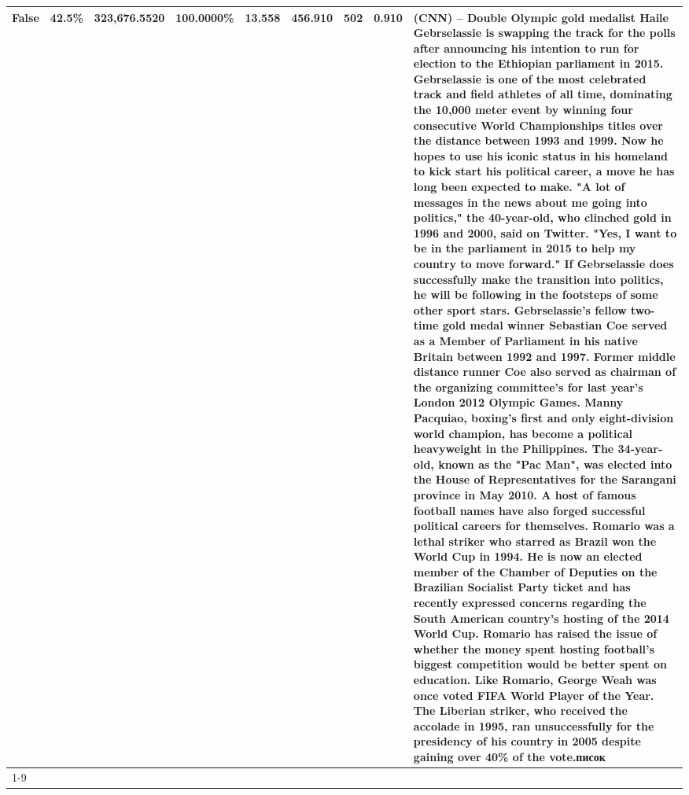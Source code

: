 \begin{table}[H]
{\begin{tabular}{lllrlllll}
False & 42.5\% & 323,676.5520 & \bfseries \color{red} 100.0000\% & 13.558 & 456.910 & 502 & 0.910 & (CNN) -- Double Olympic gold medalist Haile Gebrselassie is swapping the track for the polls after announcing his intention to run for election to the Ethiopian parliament in 2015. Gebrselassie is one of the most celebrated track and field athletes of all time, dominating the 10,000 meter event by winning four consecutive World Championships titles over the distance between 1993 and 1999. Now he hopes to use his iconic status in his homeland to kick start his political career, a move he has long been expected to make. "A lot of messages in the news about me going into politics," the 40-year-old, who clinched gold in 1996 and 2000, said on Twitter. "Yes, I want to be in the parliament in 2015 to help my country to move forward." If Gebrselassie does successfully make the transition into politics, he will be following in the footsteps of some other sport stars. Gebrselassie's fellow two-time gold medal winner Sebastian Coe served as a Member of Parliament in his native Britain between 1992 and 1997. Former middle distance runner Coe also served as chairman of the organizing committee's for last year's London 2012 Olympic Games. Manny Pacquiao, boxing's first and only eight-division world champion, has become a political heavyweight in the Philippines. The 34-year-old, known as the "Pac Man", was elected into the House of Representatives for the Sarangani province in May 2010. A host of famous football names have also forged successful political careers for themselves. Romario was a lethal striker who starred as Brazil won the World Cup in 1994. He is now an elected member of the Chamber of Deputies on the Brazilian Socialist Party ticket and has recently expressed concerns regarding the South American country's hosting of the 2014 World Cup. Romario has raised the issue of whether the money spent hosting football's biggest competition would be better spent on education. Like Romario, George Weah was once voted FIFA World Player of the Year. The Liberian striker, who received the accolade in 1995, ran unsuccessfully for the presidency of his country in 2005 despite gaining over 40\% of the vote.писок \\
\cline{1-9}

\end{tabular}}
\end{table}
